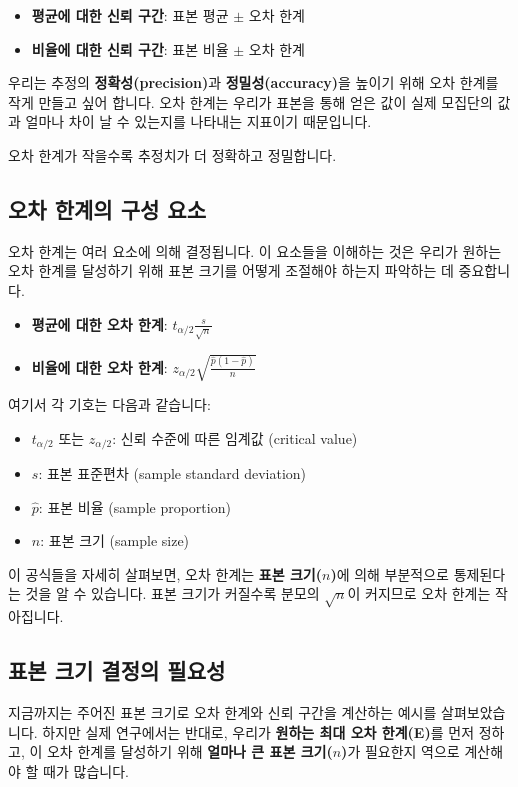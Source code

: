 \documentclass[11pt,a4paper]{article}
\begin{document}
\begin{enumerate}
\begin{enumerate}
\begin{itemize}
    \item \textbf{평균에 대한 신뢰 구간}: 표본 평균 \(\pm\) 오차 한계
    \item \textbf{비율에 대한 신뢰 구간}: 표본 비율 \(\pm\) 오차 한계
\end{itemize}

우리는 추정의 \textbf{정확성(precision)}과 \textbf{정밀성(accuracy)}을 높이기 위해 오차 한계를 작게 만들고 싶어 합니다. 오차 한계는 우리가 표본을 통해 얻은 값이 실제 모집단의 값과 얼마나 차이 날 수 있는지를 나타내는 지표이기 때문입니다.

\begin{summarybox}
    오차 한계가 작을수록 추정치가 더 정확하고 정밀합니다.
\end{summarybox}

\subsection*{오차 한계의 구성 요소}
오차 한계는 여러 요소에 의해 결정됩니다. 이 요소들을 이해하는 것은 우리가 원하는 오차 한계를 달성하기 위해 표본 크기를 어떻게 조절해야 하는지 파악하는 데 중요합니다.

\begin{itemize}
    \item \textbf{평균에 대한 오차 한계}: \(t_{\alpha/2} \frac{s}{\sqrt{n}}\)
    \item \textbf{비율에 대한 오차 한계}: \(z_{\alpha/2} \sqrt{\frac{\hat{p}(1-\hat{p})}{n}}\)
\end{itemize}
여기서 각 기호는 다음과 같습니다:
\begin{itemize}
    \item \(t_{\alpha/2}\) 또는 \(z_{\alpha/2}\): 신뢰 수준에 따른 임계값 (critical value)
    \item \(s\): 표본 표준편차 (sample standard deviation)
    \item \(\hat{p}\): 표본 비율 (sample proportion)
    \item \(n\): 표본 크기 (sample size)
\end{itemize}

이 공식들을 자세히 살펴보면, 오차 한계는 \textbf{표본 크기(\(n\))}에 의해 부분적으로 통제된다는 것을 알 수 있습니다. 표본 크기가 커질수록 분모의 \(\sqrt{n}\)이 커지므로 오차 한계는 작아집니다.

\subsection*{표본 크기 결정의 필요성}
지금까지는 주어진 표본 크기로 오차 한계와 신뢰 구간을 계산하는 예시를 살펴보았습니다. 하지만 실제 연구에서는 반대로, 우리가 \textbf{원하는 최대 오차 한계(E)}를 먼저 정하고, 이 오차 한계를 달성하기 위해 \textbf{얼마나 큰 표본 크기(\(n\))}가 필요한지 역으로 계산해야 할 때가 많습니다.


\end{enumerate}
\end{enumerate}
\end{document}
